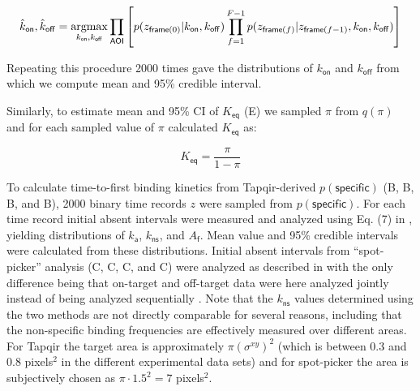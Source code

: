 \begin{equation}
    \hat{k}_\mathsf{on}, \hat{k}_\mathsf{off} = \operatorname*{argmax}_{k_\mathsf{on}, k_\mathsf{off}} \prod_\mathsf{AOI} \left[ p(z_{\mathsf{frame}(0)} | k_\mathsf{on}, k_\mathsf{off}) \prod_{f=1}^{F-1} p(z_{\mathsf{frame}(f)} | z_{\mathsf{frame}(f-1)}, k_\mathsf{on}, k_\mathsf{off}) \right]
\end{equation}

Repeating this procedure 2000 times gave the distributions of $k_\mathsf{on}$ and $k_\mathsf{off}$ from which we compute mean and 95\% credible interval.

Similarly, to estimate mean and 95\% CI of $K_\mathsf{eq}$ (E) we sampled $\pi$ from $q(\pi)$ and for each sampled value of $\pi$ calculated $K_\mathsf{eq}$ as:

\begin{equation}
    K_\mathsf{eq} = \dfrac{\pi}{1 - \pi}
\end{equation}

To calculate  time-to-first binding kinetics from Tapqir-derived $p(\mathsf{specific})$ (B, B, B, and B), 2000 binary time records $z$ were sampled from $p(\mathsf{specific})$. For each time record initial absent intervals were measured and analyzed using Eq. (7) in \cite{Friedman2015-nx}, yielding distributions of $k_\mathsf{a}$, $k_\mathsf{ns}$, and $A_\mathsf{f}$. Mean value and 95\% credible intervals were calculated from these distributions. Initial absent intervals from ``spot-picker'' analysis (C, C, C, and C) were analyzed as described in \citep{Friedman2015-nx} with the only difference being that on-target and off-target data were here analyzed jointly instead of being analyzed sequentially \citep{Friedman2015-nx}.  Note that the $k_\mathsf{ns}$ values determined using the two methods are not directly comparable for several reasons, including that the non-specific binding frequencies are effectively measured over different areas. For Tapqir the target area is approximately $ \pi \left( \sigma^{xy} \right) ^2$ (which is between 0.3 and 0.8 pixels$^2$ in the different experimental data sets) and for spot-picker the area is subjectively chosen as $\pi \cdot 1.5^2 = 7$ pixels$^2$.



